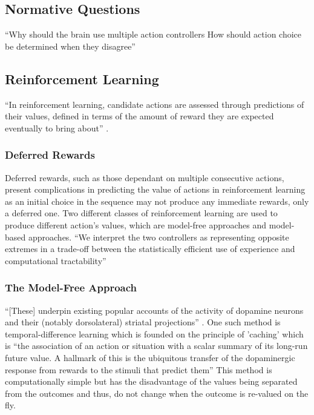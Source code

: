 \documentclass[10pt]{article}
\begin{document}
\subsection{Normative Questions}

	``Why should the brain use multiple action controllers
	How should action choice be determined when they disagree'' \parencite{Daw}


\subsection{Reinforcement Learning}

	``In reinforcement learning, candidate actions are assessed through predictions of their values, defined in terms of the amount of reward they are expected eventually to bring about'' \parencite{Daw}.

	\subsubsection{Deferred Rewards}

		Deferred rewards, such as those dependant on multiple consecutive actions, present complications in predicting the value of actions in reinforcement learning as an initial choice in the sequence may not produce any immediate rewards, only a deferred one. Two different classes of reinforcement learning are used to produce different action's values, which are model-free approaches and model-based approaches. ``We interpret the two controllers as representing opposite extremes in a trade-off between the statistically efficient use of experience and computational tractability'' \parencite{Daw}

	\subsubsection{The Model-Free Approach}

		``[These] underpin existing popular accounts of the activity of dopamine neurons and their (notably dorsolateral) striatal projections'' \parencite{Daw}. One such method is temporal-difference learning which is founded on the principle of 'caching' which is ``the association of an action or situation with a scalar summary of its long-run future value.
		A hallmark of this is the ubiquitous transfer of the dopaminergic response from rewards to the stimuli that predict them'' \parencite{Daw} This method is computationally simple but has the disadvantage of the values being separated from the outcomes and thus, do not change when the outcome is re-valued on the fly.
\end{document}
